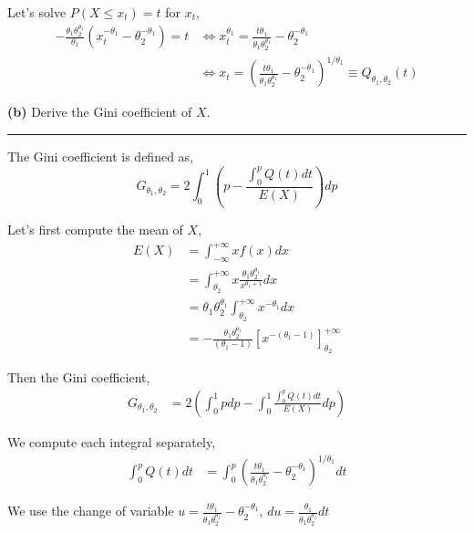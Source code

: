 \documentclass[10pt, a4paper, nofootinbib]{scrartcl}
\begin{document}
Let's solve $P(X \leq x_t) = t$ for $x_t$,
\begin{align*}
  - \frac{\theta_1 \theta_2^{\theta_1}}{\theta_1} \left( x_t^{-\theta_1} - \theta_2^{-\theta_1} \right) = t 
    &\iff x_t^{\theta_1} 
      = \frac{t \theta_1}{\theta_1 \theta_2^{\theta_1}} - \theta_2^{-\theta_1} \\
    &\iff x_t 
      = \left( \frac{t \theta_1}{\theta_1 \theta_2^{\theta_1}} - \theta_2^{-\theta_1} \right)^{1/\theta_1} \equiv Q_{\theta_1, \theta_2}(t)
\end{align*}

\textbf{(b)} Derive the Gini coefficient of $X$.

\begin{center}\rule{6cm}{0.4pt}\end{center}

The Gini coefficient is defined as, 
\begin{equation}
  G_{\theta_1, \theta_2} = 2 \int_{0}^{1} \left( p - \frac{\int_{0}^{p} Q(t) dt}{E(X)} \right) dp
\end{equation}

Let's first compute the mean of $X$,
\begin{align*}
  E(X)
    &= \int_{-\infty}^{+\infty} x f(x) dx \\
    &= \int_{\theta_2}^{+\infty} x \frac{\theta_1 \theta_2^{\theta_1}}{x^{\theta_1 + 1}} dx \\
    &= \theta_1 \theta_2^{\theta_1} \int_{\theta_2}^{+\infty} x^{- \theta_1} dx \\
    &= - \frac{\theta_1 \theta_2^{\theta_1}}{(\theta_1 - 1)} \left[ x^{-(\theta_1 - 1)} \right]_{\theta_2}^{+\infty}
\end{align*}

Then the Gini coefficient, 
\begin{align*}
  G_{\theta_1, \theta_2}
    &= 2 \left( \int_{0}^{1} p dp - \int_{0}^{1} \frac{\int_{0}^{p} Q(t) dt}{E(X)} dp \right) 
\end{align*}

We compute each integral separately,
\begin{align*}
  \int_0^p Q(t) dt 
    &= \int_0^p \left( \frac{t \theta_1}{\theta_1 \theta_2^{\theta_1}} - \theta_2^{-\theta_1} \right)^{1/\theta_1} dt
\end{align*}

We use the change of variable $u = \frac{t \theta_1}{\theta_1 \theta_2^{\theta_1}} - \theta_2^{-\theta_1}$, $du = \frac{\theta_1}{\theta_1 \theta_2^{\theta_1}} dt$
\end{document}
